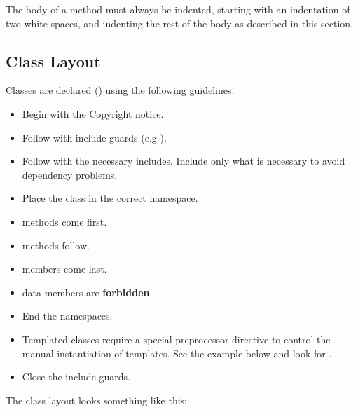 The body of a method must always be indented, starting with an indentation of
two white spaces, and indenting the rest of the body as described in this
section.


\subsection{Class Layout}%
\label{subsec:ClassLayout}

Classes are declared () using the following guidelines:
\begin{itemize}
\item Begin with the Copyright notice.
\item Follow with include guards (e.g ).
\item Follow with the necessary includes. Include only what is necessary to
avoid dependency problems.
\item Place the class in the correct namespace.
\item {} methods come first.
\item {} methods follow.
\item {} members come last.
\item {} data members are \textbf{forbidden}.
\item End the namespaces.
\item Templated classes require a special preprocessor directive to control the
manual instantiation of templates. See the example below and look for
.
\item Close the include guards.
\end{itemize}

The class layout looks something like this:

